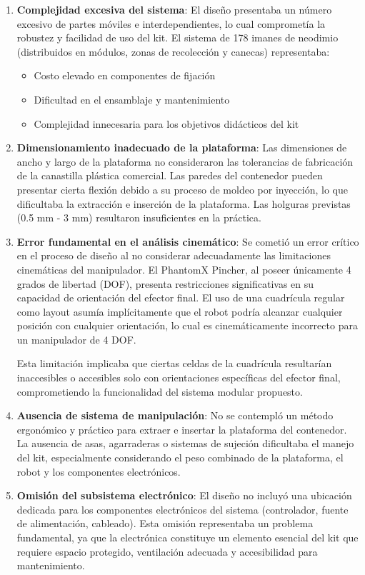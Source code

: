 \begin{enumerate}
    \item \textbf{Complejidad excesiva del sistema}: El diseño presentaba un número excesivo de partes móviles e interdependientes, lo cual comprometía la robustez y facilidad de uso del kit. El sistema de 178 imanes de neodimio (distribuidos en módulos, zonas de recolección y canecas) representaba:
    \begin{itemize}
        \item Costo elevado en componentes de fijación
        \item Dificultad en el ensamblaje y mantenimiento
        \item Complejidad innecesaria para los objetivos didácticos del kit
    \end{itemize}
    
    \item \textbf{Dimensionamiento inadecuado de la plataforma}: Las dimensiones de ancho y largo de la plataforma no consideraron las tolerancias de fabricación de la canastilla plástica comercial. Las paredes del contenedor pueden presentar cierta flexión debido a su proceso de moldeo por inyección, lo que dificultaba la extracción e inserción de la plataforma. Las holguras previstas (0.5 mm - 3 mm) resultaron insuficientes en la práctica.
    
    \item \textbf{Error fundamental en el análisis cinemático}: Se cometió un error crítico en el proceso de diseño al no considerar adecuadamente las limitaciones cinemáticas del manipulador. El PhantomX Pincher, al poseer únicamente 4 grados de libertad (DOF), presenta restricciones significativas en su capacidad de orientación del efector final. El uso de una cuadrícula regular como layout asumía implícitamente que el robot podría alcanzar cualquier posición con cualquier orientación, lo cual es cinemáticamente incorrecto para un manipulador de 4 DOF.
    
    Esta limitación implicaba que ciertas celdas de la cuadrícula resultarían inaccesibles o accesibles solo con orientaciones específicas del efector final, comprometiendo la funcionalidad del sistema modular propuesto.
    
    \item \textbf{Ausencia de sistema de manipulación}: No se contempló un método ergonómico y práctico para extraer e insertar la plataforma del contenedor. La ausencia de asas, agarraderas o sistemas de sujeción dificultaba el manejo del kit, especialmente considerando el peso combinado de la plataforma, el robot y los componentes electrónicos.
    
    \item \textbf{Omisión del subsistema electrónico}: El diseño no incluyó una ubicación dedicada para los componentes electrónicos del sistema (controlador, fuente de alimentación, cableado). Esta omisión representaba un problema fundamental, ya que la electrónica constituye un elemento esencial del kit que requiere espacio protegido, ventilación adecuada y accesibilidad para mantenimiento.
\end{enumerate}

